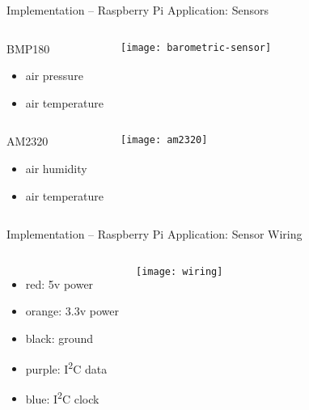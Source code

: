 \begin{frame}{Implementation -- Raspberry Pi Application: Sensors}
  \begin{columns}
    \begin{block}{BMP180}
      \begin{itemize}
        \item air pressure
        \item air temperature
      \end{itemize}
    \end{block}

    \vfill
    \centering
    \texttt{[image: barometric-sensor]}
  \end{columns}

  \begin{columns}
    \begin{block}{AM2320}
      \begin{itemize}
        \item air humidity
        \item air temperature
      \end{itemize}
    \end{block}

    \vfill
    \centering
    \texttt{[image: am2320]}
  \end{columns}
\end{frame}

\begin{frame}{Implementation -- Raspberry Pi Application: Sensor Wiring}
  \begin{columns}

    \begin{itemize}
      \item {\color{red}red:} 5v power
      \item {\color{orange}orange:} 3.3v power
      \item {\color{black}black:} ground
      \item {\color{purple}purple:} I\textsuperscript{2}C data
      \item {\color{blue}blue:} I\textsuperscript{2}C clock
    \end{itemize}

    \vspace*{1em}
    \texttt{[image: wiring]}
  \end{columns}
\end{frame}

